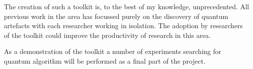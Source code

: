 The creation of such a toolkit is, to the best of my knowledge, unprecedented.
All previous work in the area has focussed purely on the discovery of quantum artefacts with each researcher working in isolation.
The adoption by researchers of the toolkit could improve the productivity of research in this area.

As a demonstration of the toolkit a number of experiments searching for quantum algorithm will be performed as a final part of the project.




